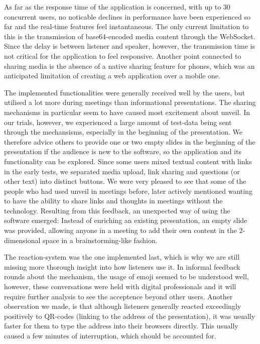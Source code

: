 As far as the response time of the application is concerned, with up to 30 concurrent users, no noticable declines in performance have been experienced so far and the real-time features feel instantaneous. The only current limitation to this is the transmission of base64-encoded media content through the WebSocket. Since the delay is between listener and speaker, however, the transmission time is not critical for the application to feel responsive. Another point connected to sharing media is the absence of a native sharing feature for phones, which was an anticipated limitation of creating a web application over a mobile one.

The implemented functionalities were generally received well by the users, but utilised a lot more during meetings than informational presentations. The sharing mechanisms in particular seem to have caused most excitement about unveil. In our trials, however, we experienced a large amount of test-data being sent through the mechansisms, especially in the beginning of the presentation. We therefore advice others to provide one or two empty slides in the beginning of the presentation if the audience is new to the software, so the application and its functionality can be explored. Since some users mixed textual content with links in the early tests, we separated media upload, link sharing and questions (or other text) into distinct buttons. We were very pleased to see that some of the people who had used unveil in meetings before, later actively mentioned wanting to have the ability to share links and thoughts in meetings without the technology. Resulting from this feedback, an unexpected way of using the software emerged: Instead of enriching an existing presentation, an empty slide was provided, allowing anyone in a meeting to add their own content in the $2$-dimensional space in a brainstorming-like fashion.

The reaction-system was the one implemented last, which is why we are still missing more thorough insight into how listeners use it. In informal feedback rounds about the mechanism, the usage of emoji seemed to be understood well, however, these conversations were held with digital professionals and it will require further analysis to see the acceptence beyond other users. Another observation we made, is that although listeners generally reacted exceedingly positively to QR-codes (linking to the address of the presentation), it was usually faster for them to type the address into their browsers directly. This usually caused a few minutes of interruption, which should be accounted for.

